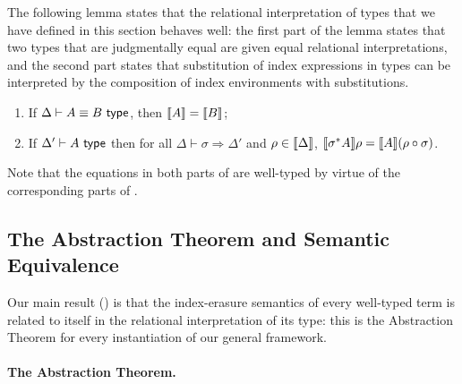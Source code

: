 The following lemma states that the relational interpretation of types
that we have defined in this section behaves well: the first part of
the lemma states that two types that are judgmentally equal are given
equal relational interpretations, and the second part states that
substitution of index expressions in types can be interpreted by the
composition of index environments with 
substitutions.
\begin{lemma}\label{lem:tyeqsubst-relational}
\par
  \begin{enumerate}
  \item If $\Delta \vdash A \equiv B \textup{\textsf{ type}}$, then $\llbracket A \rrbracket =  \llbracket B \rrbracket$;
  \item If $\Delta' \vdash A \textup{\textsf{ type}}$ then for all $\Delta \vdash \sigma \Rightarrow
    \Delta'$ and $\rho \in \llbracket \Delta \rrbracket$,
    $\llbracket \sigma^*A \rrbracket \rho = \llbracket A \rrbracket(\rho \circ \sigma)$.
  \end{enumerate}
\end{lemma}
\noindent
Note that the equations in both parts of
 are well-typed by virtue of the
corresponding parts of .



\subsection{The Abstraction Theorem and Semantic Equivalence}
\label{sec:abstraction-theorem}

Our main result
() is that the index-erasure semantics of
every well-typed term is related to itself in the relational
interpretation of its type: this is the Abstraction Theorem for every
instantiation of our general framework.

\paragraph{The Abstraction Theorem.}


